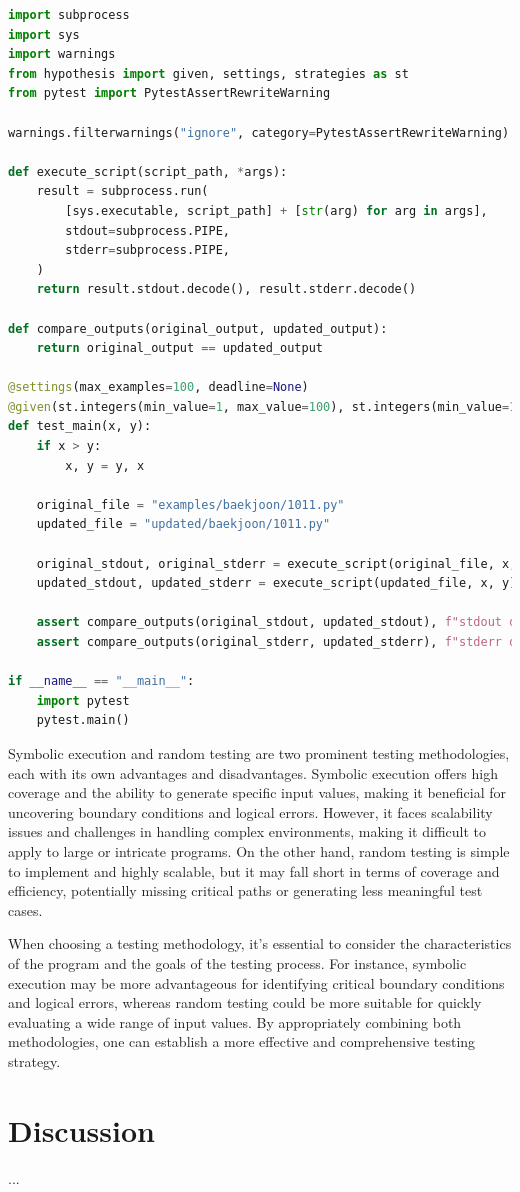 \documentclass[11pt]{article}
\begin{document}
\begin{lstlisting}[language=python]
import subprocess
import sys
import warnings
from hypothesis import given, settings, strategies as st
from pytest import PytestAssertRewriteWarning

warnings.filterwarnings("ignore", category=PytestAssertRewriteWarning)

def execute_script(script_path, *args):
    result = subprocess.run(
        [sys.executable, script_path] + [str(arg) for arg in args],
        stdout=subprocess.PIPE,
        stderr=subprocess.PIPE,
    )
    return result.stdout.decode(), result.stderr.decode()

def compare_outputs(original_output, updated_output):
    return original_output == updated_output

@settings(max_examples=100, deadline=None)
@given(st.integers(min_value=1, max_value=100), st.integers(min_value=1, max_value=100))
def test_main(x, y):
    if x > y:
        x, y = y, x 

    original_file = "examples/baekjoon/1011.py"
    updated_file = "updated/baekjoon/1011.py" 
    
    original_stdout, original_stderr = execute_script(original_file, x, y)
    updated_stdout, updated_stderr = execute_script(updated_file, x, y)
    
    assert compare_outputs(original_stdout, updated_stdout), f"stdout differs for inputs: x={x}, y={y}"
    assert compare_outputs(original_stderr, updated_stderr), f"stderr differs for inputs: x={x}, y={y}"

if __name__ == "__main__":
    import pytest
    pytest.main()
\end{lstlisting}

Symbolic execution and random testing are two prominent testing methodologies, each with its own advantages and disadvantages. Symbolic execution offers high coverage and the ability to generate specific input values, making it beneficial for uncovering boundary conditions and logical errors. However, it faces scalability issues and challenges in handling complex environments, making it difficult to apply to large or intricate programs. On the other hand, random testing is simple to implement and highly scalable, but it may fall short in terms of coverage and efficiency, potentially missing critical paths or generating less meaningful test cases.

When choosing a testing methodology, it's essential to consider the characteristics of the program and the goals of the testing process. For instance, symbolic execution may be more advantageous for identifying critical boundary conditions and logical errors, whereas random testing could be more suitable for quickly evaluating a wide range of input values. By appropriately combining both methodologies, one can establish a more effective and comprehensive testing strategy.


\section{Discussion}
...\\
\end{document}

